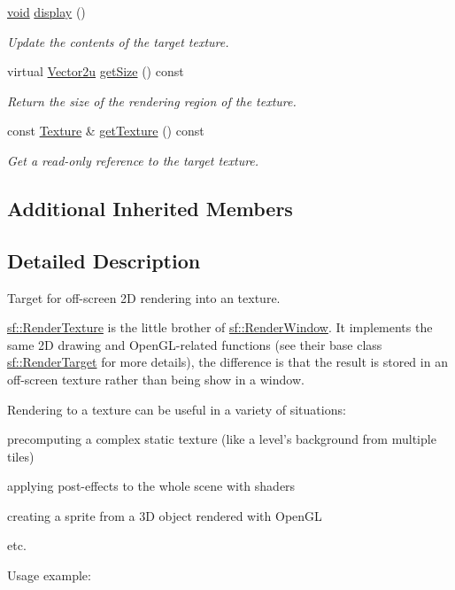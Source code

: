 \begin{DoxyCompactItemize}
\hyperlink{glutf90_8h_ac778d6f63f1aaf8ebda0ce6ac821b56e}{void} \hyperlink{classsf_1_1_render_texture_af92886d5faef3916caff9fa9ab32c555}{display} ()
\begin{DoxyCompactList}\small\item\em Update the contents of the target texture. \end{DoxyCompactList}\item 
virtual \hyperlink{namespacesf_aaa02ba42bf79b001a376fe9d79254cb3}{Vector2u} \hyperlink{classsf_1_1_render_texture_a757ba45ec7a7deefcaef717049b00b8c}{get\-Size} () const 
\begin{DoxyCompactList}\small\item\em Return the size of the rendering region of the texture. \end{DoxyCompactList}\item 
const \hyperlink{classsf_1_1_texture}{Texture} \& \hyperlink{classsf_1_1_render_texture_a95bc5152c497066d31fdc57da8e17678}{get\-Texture} () const 
\begin{DoxyCompactList}\small\item\em Get a read-\/only reference to the target texture. \end{DoxyCompactList}\end{DoxyCompactItemize}
\subsection*{Additional Inherited Members}


\subsection{Detailed Description}
Target for off-\/screen 2\-D rendering into an texture. 

\hyperlink{classsf_1_1_render_texture}{sf\-::\-Render\-Texture} is the little brother of \hyperlink{classsf_1_1_render_window}{sf\-::\-Render\-Window}. It implements the same 2\-D drawing and Open\-G\-L-\/related functions (see their base class \hyperlink{classsf_1_1_render_target}{sf\-::\-Render\-Target} for more details), the difference is that the result is stored in an off-\/screen texture rather than being show in a window.

Rendering to a texture can be useful in a variety of situations\-: \begin{DoxyItemize}
\item precomputing a complex static texture (like a level's background from multiple tiles) \item applying post-\/effects to the whole scene with shaders \item creating a sprite from a 3\-D object rendered with Open\-G\-L \item etc.\end{DoxyItemize}
Usage example\-:


